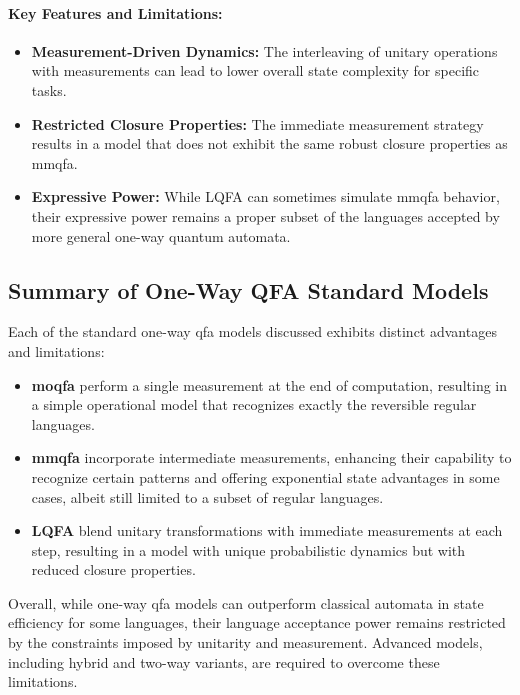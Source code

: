 \paragraph{Key Features and Limitations:}
\begin{itemize}
    \item \textbf{Measurement-Driven Dynamics:} The interleaving of unitary operations with measurements can lead to lower overall state complexity for specific tasks.
    \item \textbf{Restricted Closure Properties:} The immediate measurement strategy results in a model that does not exhibit the same robust closure properties as \gls{mmqfa}.
    \item \textbf{Expressive Power:} While LQFA can sometimes simulate \gls{mmqfa} behavior, their expressive power remains a proper subset of the languages accepted by more general one-way quantum automata.
\end{itemize}

\subsection*{Summary of One-Way QFA Standard Models}
Each of the standard one-way \gls{qfa} models discussed exhibits distinct advantages and limitations:
\begin{itemize}
    \item \textbf{\gls{moqfa}} perform a single measurement at the end of computation, resulting in a simple operational model that recognizes exactly the reversible regular languages.
    \item \textbf{\gls{mmqfa}} incorporate intermediate measurements, enhancing their capability to recognize certain patterns and offering exponential state advantages in some cases, albeit still limited to a subset of regular languages.
    \item \textbf{LQFA} blend unitary transformations with immediate measurements at each step, resulting in a model with unique probabilistic dynamics but with reduced closure properties.
\end{itemize}
Overall, while one-way \gls{qfa} models can outperform classical automata in state efficiency for some languages, their language acceptance power remains restricted by the constraints imposed by unitarity and measurement. Advanced models, including hybrid and two-way variants, are required to overcome these limitations.

